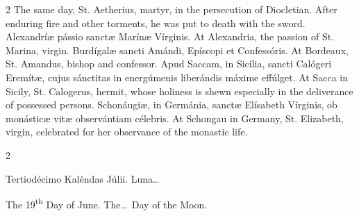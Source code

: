\begin{paracol}{2}
\switchcolumn
{}
The same day, St. Aetherius, martyr, 
 in the persecution of Diocletian. After enduring fire and other 
 torments, he was put to death with the sword.
\switchcolumn*
{}
Alexandríæ pássio 
 sanctæ Marínæ Vírginis.
\switchcolumn
{}
At Alexandria, the passion of St. 
 Marina, virgin.
\switchcolumn*
{}
Burdígalæ sancti Amándi, 
 Epíscopi et Confessóris.
\switchcolumn
{}
At Bordeaux, St. Amandus, bishop and 
 confessor.
\switchcolumn*
{}
Apud Saccam, in Sicília, 
 sancti Calógeri Eremítæ, cujus sánctitas in energúmenis liberándis máxime 
 effúlget.
\switchcolumn
{}
At Sacca in Sicily, St. Calogerus, 
 hermit, whose holiness is shewn especially in the deliverance of possessed 
 persons.
\switchcolumn*
{}
Schonáugiæ, in Germánia, sanctæ Elísabeth Vírginis, ob monásticæ vitæ observántiam célebris.
\switchcolumn
{}
At Schongau in Germany, St. 
 Elizabeth, virgin, celebrated for her observance of the monastic life.
\switchcolumn*
{}
\end{paracol}


\begin{paracol}{2}
\begin{center}{\color{gregoriocolor} Tertiodécimo Kaléndas Júlii. 
 Luna\dots\ }\end{center}
\switchcolumn
{}
\begin{center}{\color{gregoriocolor} The 19\textsuperscript{th} Day of 
 June. The\dots\ Day of the Moon.}\end{center}
\end{paracol}

